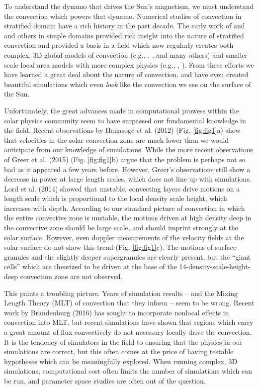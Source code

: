 \documentclass[aps, pre, onecolumn, nofootinbib, notitlepage, groupedaddress, amsfonts, amssymb, amsmath, longbibliography]{revtex4-1}
\begin{document}
To understand the dynamo that drives the Sun's magnetism, we must understand the convection
which powers that dynamo.  Numerical studies of convection in stratified domain have a
rich history in the past decade.  The early work of \cite{graham1975} and \cite{hurlburt&all1984} and others in simple
domains provided rich insight into the nature of stratified convection and provided a basis
in a field which now regularly creates both complex, 3D global models of convection
(e.g., \cite{brown&all2010}, \cite{guerrero&all2016}, and many others)
and smaller scale local area models with more complex physics 
(e.g., \cite{stein&nordlund2012}, \cite{rempel2014}).
From these efforts we have learned a great deal about the nature of convection, and have
even created beautiful simulations which even \emph{look} like the convection we see on the
surface of the Sun.

Unfortunately, the great advances made in computational prowess within the solar physics
community seem to have surpassed our fundamental knowledge in the field. Recent observations
by Hanasoge et al. (2012) \cite{hanasoge&all2012} (Fig. \ref{fig:fig1}a) show that 
velocities in the solar convection zone
are much lower than we would anticipate from our knowledge of simulations.  While the
more recent observations of Greer et al. (2015) \cite{greer&all2015} (Fig. \ref{fig:fig1}b) 
argue that the problem is perhaps not so bad
as it appeared a few years before.  However, Greer's observations still show a decrease in power at
large length scales, which does not line up with simulations.  Lord et al. (2014) \cite{lord&all2014} showed
that unstable, convecting layers drive motions on a length scale which is proportional to
the local density scale height, which increases with depth.  According to our standard picture of convection
in which the entire convective zone is unstable, the motions driven at high density deep in the convective
zone should be large scale, and should imprint strongly at the solar surface.
However, even doppler measurements of the velocity fields at the solar surface do not show this trend
\cite{hathaway&all2015}
(Fig. \ref{fig:fig1}c).  The motions of surface granules and the slightly deeper supergranules are
clearly present, but the
``giant cells'' which are theorized to be driven at the base of the 14-density-scale-height-deep
convection zone are not observed.

This paints a troubling picture.  Years of simulation results -- and the Mixing Length
Theory (MLT) of convection that they inform -- seem to be wrong.  Recent work by
Brandenburg (2016) \cite{brandenburg2016} has sought to incorporate nonlocal effects in
convection into MLT, but recent simulations \cite{kapyla&all2017} have shown that regions which
carry a great amount of flux convectively do not necessary locally drive the convection.
It is the tendency of simulators in the field to ensuring that the physics in our simulations are 
correct, but this often comes at the price of having testable hypotheses which can be meaningfully
explored. When running complex, 3D simulations, 
computational cost often limits the number of simulations which can be
run, and parameter space studies are often out of the question.  
\end{document}
